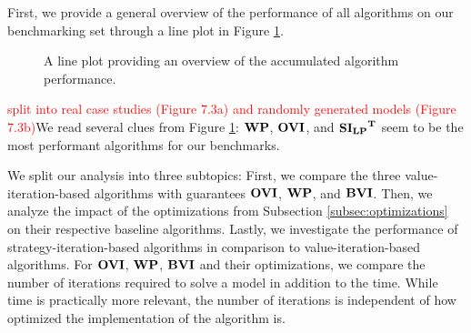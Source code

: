 First, we provide a general overview of the performance of all algorithms on our benchmarking set through a line plot in Figure \ref{fig:AlgoPerformance}.
\begin{figure}[h!]
    \centering
    \qquad
    \caption[Overview of Algorithm Performance]{
        A line plot providing an overview of the accumulated algorithm performance.
        }%
    \label{fig:AlgoPerformance}
\end{figure}


\textcolor{red}{split into real case studies (Figure 7.3a) and randomly generated models (Figure 7.3b)}We read several clues from Figure \ref{fig:AlgoPerformance}:
$\mathbf{WP}$, $\mathbf{OVI}$, and $\mathbf{\mathbf{SI_{LP}}^T}$ seem to be the most performant algorithms for our benchmarks.

We split our analysis into three subtopics: 
First, we compare the three value-iteration-based algorithms with guarantees $\mathbf{OVI}$, $\mathbf{WP}$, and $\mathbf{BVI}$. 
Then, we analyze the impact of the optimizations from Subsection \ref{subsec:optimizations} on their respective baseline algorithms.
Lastly, we investigate the performance of strategy-iteration-based algorithms in comparison to value-iteration-based algorithms.
For $\mathbf{OVI}$, $\mathbf{WP}$, $\mathbf{BVI}$ and their optimizations, we compare the number of iterations required to solve a model in addition to the time.
While time is practically more relevant, the number of iterations is independent of how optimized the implementation of the algorithm is.
\FloatBarrier

